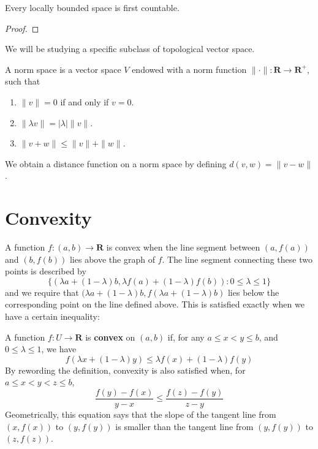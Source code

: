 \begin{theorem}
    Every locally bounded space is first countable.
\end{theorem}
\begin{proof}
    
\end{proof}

We will be studying a specific subclass of topological vector space.

\begin{definition}
    A norm space is a vector space $V$ endowed with a norm function $\| \cdotp \|: \mathbf{R} \to \mathbf{R}^+$, such that
    \begin{enumerate}
        \item $\| v \| = 0$ if and only if $v = 0$.
        \item $\| \lambda v \| = | \lambda | \| v \|$.
        \item $\| v + w \| \leq \| v \| + \| w \|$.
    \end{enumerate}
    We obtain a distance function on a norm space by defining $d(v,w) = \| v - w \|$.
\end{definition}








\section{Convexity}

A function $f:(a,b) \to \mathbf{R}$ is convex when the line segment between $(a,f(a))$ and $(b,f(b))$ lies above the graph of $f$. The line segment connecting these two points is described by
%
\[ \{ (\lambda a + (1 - \lambda) b, \lambda f(a) + (1 - \lambda) f(b)) : 0 \leq \lambda \leq 1 \} \]
%
and we require that $(\lambda a + (1 - \lambda)b, f(\lambda a + (1 - \lambda)b)$ lies below the corresponding point on the line defined above. This is satisfied exactly when we have a certain inequality:

\begin{definition}
    A function $f:U \to \mathbf{R}$ is {\bf convex} on $(a,b)$ if, for any $a \leq x < y \leq b$, and $0 \leq \lambda \leq 1$, we have
    \begin{equation} \label{convex1} f(\lambda x + (1 - \lambda) y) \leq \lambda f(x) + (1 - \lambda) f(y) \end{equation}
    By rewording the definition, convexity is also satisfied when, for $a \leq x < y < z \leq b$,
    \begin{equation} \label{convex2} \frac{f(y) - f(x)}{y - x} \leq \frac{f(z) - f(y)}{z - y} \end{equation}
    Geometrically, this equation says that the slope of the tangent line from $(x, f(x))$ to $(y, f(y))$ is smaller than the tangent line from $(y, f(y))$ to $(z, f(z))$.
\end{definition}

